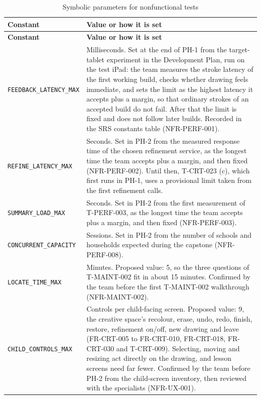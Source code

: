 \documentclass[12pt, titlepage]{article}
\begin{document}
{\small
\begin{longtable}{@{}>{\raggedright\arraybackslash}p{}>{\raggedright\arraybackslash}p{}@{}}
\caption{Symbolic parameters for nonfunctional tests}
\label{tab:symb-nfr}\\
\toprule
\textbf{Constant} & \textbf{Value or how it is set}\\
\midrule
\endfirsthead
\toprule
\textbf{Constant} & \textbf{Value or how it is set}\\
\midrule
\endhead
\texttt{FEEDBACK\_\allowbreak LATENCY\_\allowbreak MAX} & Milliseconds. Set at the end of PH-1 from
the target-tablet experiment in the Development Plan, run on the test iPad:
the team measures the stroke latency of the first
working build, checks whether drawing feels immediate, and sets the
limit as the highest latency it accepts plus a margin, so that ordinary
strokes of an accepted build do not fail. After that the limit is fixed
and does not follow later builds. Recorded in the SRS constants table (NFR-PERF-001).\\
\addlinespace
\texttt{REFINE\_LATENCY\_MAX} & Seconds. Set in PH-2 from the measured
response time of the chosen refinement service, as the longest time the team
accepts plus a margin, and then fixed (NFR-PERF-002). Until then, T-CRT-023 (c),
which first runs in PH-1, uses a provisional limit taken from the first
refinement calls.\\
\addlinespace
\texttt{SUMMARY\_LOAD\_MAX} & Seconds. Set in PH-2 from the first
measurement of T-PERF-003, as the longest time the team accepts plus a margin,
and then fixed (NFR-PERF-003).\\
\addlinespace
\texttt{CONCURRENT\_CAPACITY} & Sessions. Set in PH-2 from the number of
schools and households expected during the capstone (NFR-PERF-008).\\
\addlinespace
\texttt{LOCATE\_TIME\_MAX} & Minutes. Proposed value: 5, so the three questions
of T-MAINT-002 fit in about 15 minutes. Confirmed by the team before the first
T-MAINT-002 walkthrough (NFR-MAINT-002).\\
\addlinespace
\texttt{CHILD\_CONTROLS\_MAX} & Controls per child-facing screen. Proposed
value: 9, the creative space's recolour, erase, undo, redo, finish, restore,
refinement on/off, new drawing and leave (FR-CRT-005 to FR-CRT-010, FR-CRT-018,
FR-CRT-030 and T-CRT-009). Selecting, moving and resizing act directly on the drawing, and
lesson screens need far fewer. Confirmed by the team before PH-2 from the
child-screen inventory, then reviewed with the specialists (NFR-UX-001).\\

\end{longtable}}
\end{document}
